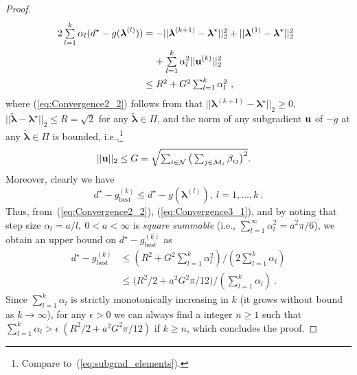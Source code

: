 \documentclass[journal, 10pt, twocolumn]{IEEEtran}
\newcommand{\be}{\begin{equation}}
\newcommand{\ee}{\end{equation}}
\renewcommand{\vec}[1]{\bf{#1}}     \newcommand{\vecsc}[1]{\mbox {\boldmath \scriptsize $#1$}}     \newcommand{\itvec}[1]{\mbox {\boldmath $#1$}}
\begin{document}
\begin{proof}
\begin{subequations}
\begin{align}\label{eq:Convergence2_1}
 \hspace{-2mm}2\displaystyle \mathop{\textstyle{\sum}}_{l =1}^{k} \alpha_l(d^\star-g(\boldsymbol\lambda^{(l)})) & \textstyle = -||{\boldsymbol\lambda}^{(k+1)}-{\boldsymbol\lambda}^\star||^2_2+||{\boldsymbol\lambda}^{(1)}-{\boldsymbol\lambda}^\star||^2_2\nonumber \\
 &\hspace{4mm}+\displaystyle \mathop{\textstyle{\sum}}_{l =1}^{k}\alpha^2_l||{\vec u}^{(k)}||^2_2\\ \label{eq:Convergence2_2}
  & \textstyle \leq R^2 + G^2 \sum_{l=1}^{k}\alpha^2_l\ ,
\end{align}
\end{subequations}
where (\ref{eq:Convergence2_2}) follows from that $||{\boldsymbol\lambda}^{(k+1)}-{\boldsymbol\lambda}^\star||_2\geq0$, $||\tilde{\boldsymbol\lambda}-{\boldsymbol\lambda}^\star||_2\leq R=\sqrt{2}$ for any $\tilde{\boldsymbol\lambda}\in\Pi$, and the norm of any subgradient ${\vec u}$ of $-g$  at any $\tilde{\boldsymbol\lambda}\in\Pi$ is bounded, i.e.,\footnote{Compare to~(\ref{eq:subgrad_elements}).}
\be\label{eq:normBound}
\hspace{-0mm}||{\vec u}||_2\leq G=\sqrt{\textstyle\sum_{i\in\mathcal{N}}\big(\sum_{j\in\mathcal{M}_i}\beta_{ij}\big)^2}. \quad
\ee
Moreover, clearly we have
\be\label{eq:Convergence3_1}
d^\star-g^{(k)}_{\mathrm{best}}\leq d^\star-g(\boldsymbol\lambda^{(l)}), \ l=1,\ldots,k \ .
\ee
Thus, from~(\ref{eq:Convergence2_2}), (\ref{eq:Convergence3_1}), and by noting that step size $\alpha_l=a/l, \ 0<a<\infty$ is \emph{square summable} \big(i.e., $\sum_{l=1}^\infty\alpha^2_l=a^2\pi/6$\big), we obtain an upper bound on $d^\star-g^{(k)}_{\mathrm{best}}$ as
\begin{subequations}\label{eq:Convergence4_1}
\begin{align}\label{eq:Convergence4_11}
\textstyle d^\star-g^{(k)}_{\mathrm{best}} & \leq \textstyle(R^2 + G^2 \sum_{l=1}^{k}\alpha^2_l)/( 2\sum_{l=1}^{k}\alpha_l)\\ \label{eq:Convergence4_12}
& \leq  \textstyle\big(R^2/2 + a^2G^2 \pi/12\big)/(\sum_{l=1}^{k}\alpha_l) \ .
\end{align}
\end{subequations}
Since $\sum_{l=1}^{k}\alpha_l$ is strictly monotonically increasing in $k$ (it grows without bound as $k\rightarrow\infty$), for any $\epsilon >0$ we can always find a integer $n\geq 1$ such that $\sum_{l=1}^k\alpha_l> \epsilon \ (R^2/2 +a^2G^2 \pi/12)$ if $k\geq n$, which concludes the proof.
\end{proof}
\end{document}
